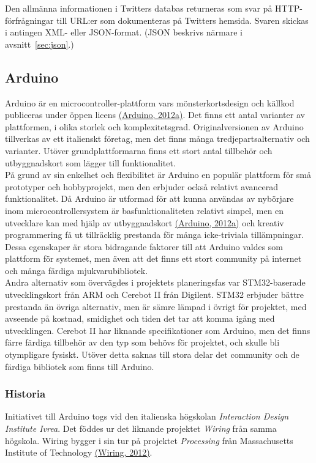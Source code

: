 \documentclass[a4paper,11pt]{article}
\begin{document}
Den allmänna informationen i Twitters databas returneras som svar på HTTP-förfrågningar till URL:er som dokumenteras på Twitters hemsida. Svaren skickas i antingen XML- eller JSON-format. (JSON beskrivs närmare i avsnitt~\ref{sec:json}.)

\subsection{Arduino}
Arduino är en microcontroller-plattform vars mönsterkortsdesign och källkod publiceras under öppen licens \hyperref[arduino]{(Arduino, 2012a)}. Det finns ett antal varianter av plattformen, i olika storlek och komplexitetsgrad. Originalversionen av Arduino tillverkas av ett italienskt företag, men det finns många tredjepartsalternativ och varianter. Utöver grundplattformarna finns ett stort antal tillbehör och utbyggnadskort som lägger till funktionalitet.\\

På grund av sin enkelhet och flexibilitet är Arduino en populär plattform för små prototyper och hobbyprojekt, men den erbjuder också relativt avancerad funktionalitet. Då Arduino är utformad för att kunna användas av nybörjare inom microcontrollersystem är basfunktionaliteten relativt simpel, men en utvecklare kan med hjälp av utbyggnadskort \hyperref[arduino]{(Arduino, 2012a)} och kreativ programmering få ut tillräcklig prestanda för många icke-triviala tillämpningar. Dessa egenskaper är stora bidragande faktorer till att Arduino valdes som plattform för systemet, men även att det finns ett stort community på internet och många färdiga mjukvarubibliotek.\\

 Andra alternativ som övervägdes i projektets planeringsfas var STM32-baserade utvecklingskort från ARM och Cerebot II från Digilent. STM32 erbjuder bättre prestanda än övriga alternativ, men är sämre lämpad i övrigt för projektet, med avseende på kostnad, smidighet och tiden det tar att komma igång med utvecklingen. Cerebot II har liknande specifikationer som Arduino, men det finns färre färdiga tillbehör av den typ som behövs för projektet, och skulle bli otympligare fysiskt. Utöver detta saknas till stora delar det community och de färdiga bibliotek som finns till Arduino.\\

\subsubsection{Historia}
Initiativet till Arduino togs vid den italienska högskolan {\it Interaction Design Institute Ivrea}. Det föddes ur det liknande projektet {\it Wiring} från samma högskola. Wiring bygger i sin tur på projektet {\it Processing} från Massachusetts Institute of Technology \hyperref[wiring]{(Wiring, 2012)}. \\
\end{document}

